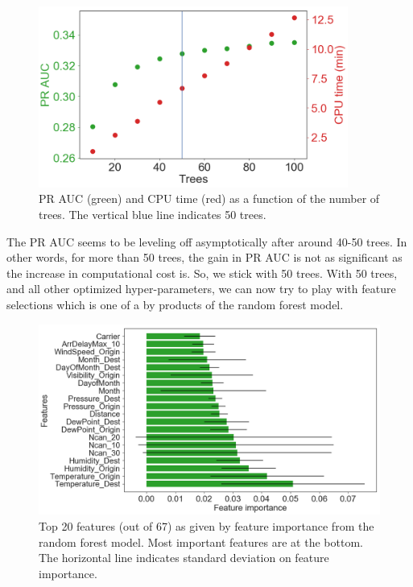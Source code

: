 \documentclass[12pt]{article}
\begin{document}
\begin{figure}[!h]
\begin{center}
\includegraphics[width=4in]{RF_tree_effects.pdf}
\end{center}
\caption{\label{fig:RF_trees}
PR AUC (green) and CPU time (red) as a function of the number of trees. The vertical blue line indicates 50 trees.}
\end{figure}
The PR AUC  seems to be leveling off asymptotically after around 40-50 trees. In other words, for more than 50 trees, the gain in PR AUC is not as significant as the increase in computational cost is. So, we stick with 50 trees. With 50 trees, and all other optimized hyper-parameters, we can now try to play with feature selections which is one of a by products of the random forest model. 
\begin{figure}[!h]
\begin{center}
\includegraphics[width=6in]{RF_FI.pdf}
\end{center}
\caption{\label{fig:RF_FI}
Top 20 features (out of 67) as given by feature importance from the random forest model. Most important features are at the bottom. The horizontal line indicates standard deviation on feature importance.}
\end{figure}
\end{document}
